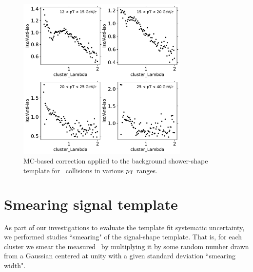 \begin{figure}
	\center
	\includegraphics[width=0.76\textwidth]{Appendices/bkg-template-correction-p-Pb}
	\caption{MC-based correction applied to the background shower-shape template for \pPb~collisions in various $p_{\mathrm{T}}$ ranges.}
	\label{fig:bkgCorrection}
\end{figure}

\section{Smearing signal template}
\label{sec:smearingsignaltemplate}
As part of our investigations to evaluate the template fit systematic uncertainty, we performed studies ``smearing" of the signal-shape template. That is, for each cluster we smear the measured \lambdasquare~by multiplying it by some random number drawn from a Gaussian centered at unity with a given standard deviation ``smearing width".

